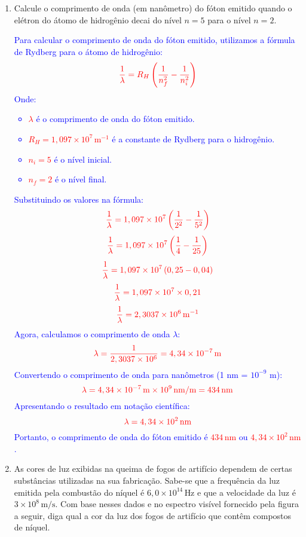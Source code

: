 \documentclass[a4paper, 12pt]{article}
\begin{document}
\begin{enumerate}
	\item Calcule o comprimento de onda (em nanômetro) do fóton emitido quando o elétron do átomo de hidrogênio decai do nível \(n = 5\) para o nível \(n = 2\).
	      
	      \textcolor{blue}{
	      Para calcular o comprimento de onda do fóton emitido, utilizamos a fórmula de Rydberg para o átomo de hidrogênio:
	      \[
		      \textcolor{red}{\frac{1}{\lambda} = R_H \left( \frac{1}{n_f^2} - \frac{1}{n_i^2} \right)}
	      \]
	      Onde:
	      \begin{itemize}
		      \item[] \textcolor{red}{\(\lambda\)} é o comprimento de onda do fóton emitido.
		      \item[] \textcolor{red}{\(R_H = 1,097 \times 10^7 \, \text{m}^{-1}\)} é a constante de Rydberg para o hidrogênio.
		      \item[] \textcolor{red}{\(n_i = 5\)} é o nível inicial.
		      \item[] \textcolor{red}{\(n_f = 2\)} é o nível final.
	      \end{itemize}
	      Substituindo os valores na fórmula:
	      \[
		      \textcolor{red}{\frac{1}{\lambda} = 1,097 \times 10^7 \left( \frac{1}{2^2} - \frac{1}{5^2} \right)}
	      \]
	      \[
		      \textcolor{red}{\frac{1}{\lambda} = 1,097 \times 10^7 \left( \frac{1}{4} - \frac{1}{25} \right)}
	      \]
	      \[
		      \textcolor{red}{\frac{1}{\lambda} = 1,097 \times 10^7 \left( 0,25 - 0,04 \right)}
	      \]
	      \[
		      \textcolor{red}{\frac{1}{\lambda} = 1,097 \times 10^7 \times 0,21}
	      \]
	      \[
		      \textcolor{red}{\frac{1}{\lambda} = 2,3037 \times 10^6 \, \text{m}^{-1}}
	      \]
	      Agora, calculamos o comprimento de onda \(\lambda\):
	      \[
		      \textcolor{red}{\lambda = \frac{1}{2,3037 \times 10^6} = 4,34 \times 10^{-7} \, \text{m}}
	      \]
	      Convertendo o comprimento de onda para nanômetros {(1 nm = \(10^{-9}\) m)}:
	      \[
		      \textcolor{red}{\lambda = 4,34 \times 10^{-7} \, \text{m} \times 10^9 \, \text{nm/m} = 434 \, \text{nm}}
	      \]
	      Apresentando o resultado em notação científica:
	      \[
		      \textcolor{red}{\lambda = 4,34 \times 10^{2} \, \text{nm}}
	      \]
	      Portanto, o comprimento de onda do fóton emitido é \textcolor{red}{\(434 \, \text{nm}\)} ou \textcolor{red}{\(4,34 \times 10^{2} \, \text{nm}\)}.
	      }
	      
	      
	      \pagebreak
	\item As cores de luz exibidas na queima de fogos de artifício dependem de certas substâncias utilizadas na sua fabricação. Sabe-se que a frequência da luz emitida pela combustão do níquel é \(6,0 \times 10^{14} \, \text{Hz}\) e que a velocidade da luz é \(3 \times 10^{8} \, \text{m/s}\). Com base nesses dados e no espectro visível fornecido pela figura a seguir, diga qual a cor da luz dos fogos de artifício que contêm compostos de níquel.
	      

\end{enumerate}
\end{document}
